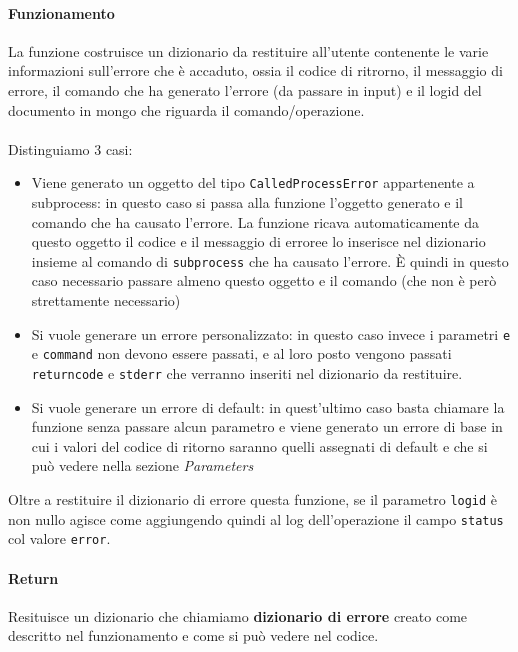 \documentclass[11pt]{article}
\begin{document}
\paragraph{Funzionamento}
La funzione costruisce un dizionario da restituire all'utente contenente le varie informazioni sull'errore che è accaduto, ossia
il codice di ritrorno, il messaggio di errore, il comando che ha generato l'errore (da passare in input) e il logid del documento
in mongo che riguarda il comando/operazione.
\\~\\
Distinguiamo 3 casi:
\begin{itemize}
	\item{Viene generato un oggetto del tipo \texttt{CalledProcessError} appartenente a subprocess: in questo caso si passa alla funzione
		l'oggetto generato e il comando che ha causato l'errore. La funzione ricava automaticamente da questo oggetto il codice
		e il messaggio di erroree lo inserisce nel dizionario insieme al comando di \texttt{subprocess} che ha causato l'errore.
		È quindi in questo caso necessario passare almeno questo oggetto e il comando (che non è però strettamente necessario)}
	\item{Si vuole generare un errore personalizzato: in questo caso invece i parametri \texttt{e} e \texttt{command} non devono essere passati,
		e al loro posto vengono passati \texttt{returncode} e \texttt{stderr} che verranno inseriti nel dizionario da restituire.}
	\item{Si vuole generare un errore di default: in quest'ultimo caso basta chiamare la funzione senza passare alcun parametro e viene
		generato un errore di base in cui i valori del codice di ritorno saranno quelli assegnati di default e che si può vedere
		nella sezione \textit{Parameters}}
\end{itemize}
Oltre a restituire il dizionario di errore questa funzione, se il parametro \texttt{logid} è non nullo agisce come  
aggiungendo quindi al log dell'operazione il campo \texttt{status} col valore \texttt{error}.
\paragraph{Return}
Resituisce un dizionario che chiamiamo \textbf{dizionario di errore} creato come descritto nel funzionamento e come si può vedere nel codice.
\end{document}
